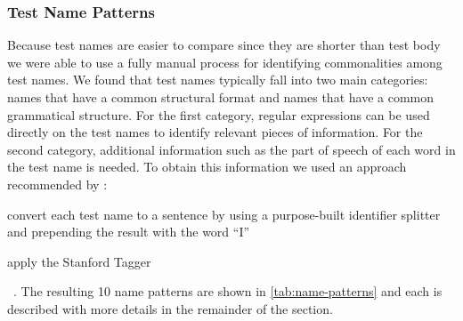\subsubsection{Test Name Patterns}
\label{sec:name-patterns}

Because test names are easier to compare since they are shorter than test body we were able to use a fully manual process for identifying commonalities among test names.
%
We found that test names typically fall into two main categories: names that have a common structural format and names that have a common grammatical structure.
%
For the first category, regular expressions can be used directly on the test names to identify relevant pieces of information.
%
For the second category, additional information such as the part of speech of each word in the test name is needed.
%
To obtain this information we used an approach recommended by \citeauthor{olney16tagging}:
\begin{enumerate*}
\item convert each test name to a sentence by using a purpose-built identifier splitter and prepending the result with the word \enquote{I}
\item apply the Stanford Tagger~\cite{StanfordTagger}
\end{enumerate*}~\cite{olney16tagging}.
%
The resulting \num{10} name patterns are shown in \cref{tab:name-patterns} and each is described with more details in the remainder of the section.


